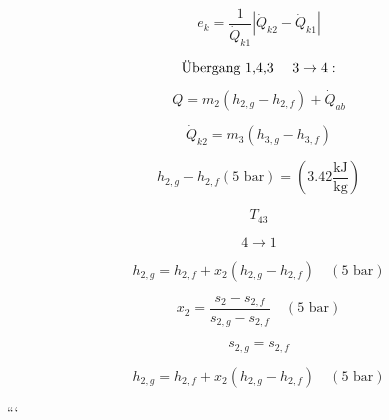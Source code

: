 \[
e_k = \frac{1}{\dot{Q}_{k1}} \left| \dot{Q}_{k2} - \dot{Q}_{k1} \right|
\]

\[
\text{Übergang 1,4,3 \quad 3} \rightarrow 4:
\]

\[
Q = m_2 (h_{2,g} - h_{2,f}) + \dot{Q}_{ab}
\]

\[
\dot{Q}_{k2} = m_3 (h_{3,g} - h_{3,f})
\]

\[
h_{2,g} - h_{2,f} \left( 5 \text{ bar} \right) = (3.42 \frac{\text{kJ}}{\text{kg}})
\]

\[
T_{43}
\]

\[
4 \rightarrow 1
\]

\[
h_{2,g} = h_{2,f} + x_{2} (h_{2,g} - h_{2,f}) \quad (5 \text{ bar})
\]

\[
x_2 = \frac{s_2 - s_{2,f}}{s_{2,g} - s_{2,f}} \quad (5 \text{ bar})
\]

\[
s_{2,g} = s_{2,f}
\]

\[
h_{2,g} = h_{2,f} + x_{2} (h_{2,g} - h_{2,f}) \quad (5 \text{ bar})
\]

```